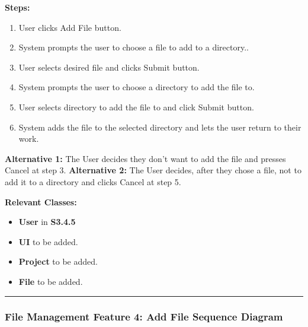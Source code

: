 \documentclass[twoside,letterpaper]{article}
\begin{document}
\noindent\textbf{Steps:} \begin{enumerate}
	\item User clicks Add File button.
	\item System prompts the user to choose a file to add to a directory..
	\item User selects desired file and clicks Submit button.
	\item System prompts the user to choose a directory to add the file to.
	\item User selects directory to add the file to and click Submit button.
	\item System adds the file to the selected directory and lets the user return to their work.

\end{enumerate}
\noindent\textbf{Alternative 1:} The User decides they don't want to add the file and presses Cancel at step 3. \newline
\noindent\textbf{Alternative 2:} The User decides, after they chose a file, not to add it to a directory and clicks Cancel at step 5. \newline

\noindent\textbf{Relevant Classes:}
\begin{itemize}
	\item \textbf{User} in \textbf{S3.4.5}
	\item \textbf{UI} to be added.
	\item \textbf{Project} to be added.
	\item \textbf{File} to be added.
\end{itemize}
\vspace{8pt}
\hrule
\bigskip

\newpage

\subsubsection[File Management Feature 4: Add File Sequence Diagram]{\rmfamily\bfseries\color{black}
	File Management Feature 4: Add File Sequence Diagram}
\hypertarget{RefHeading22059017292}{}
\end{document}
